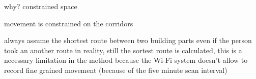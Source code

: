 why?
constrained space

movement is constrained on the corridors

always assume the shortest route between two building parts
even if the person took an another route in reality, still the sortest route is
calculated, this is a necessary limitation in the method because the Wi-Fi
system doesn't allow to record fine grained movement (because of the five
minute scan interval)


